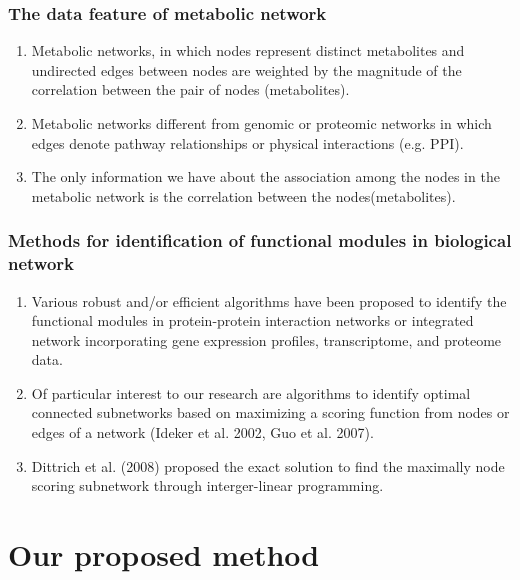 \documentclass[10pt]{beamer}
\begin{document}
\begin{frame}
  \frametitle{The data feature of metabolic network}
    \begin{enumerate}
   \item<1-> Metabolic networks, in which nodes represent distinct metabolites and undirected edges between nodes are weighted by the magnitude of the correlation between the pair of nodes (metabolites). \pause
   \\
    \vspace{1ex}
   \item<2-> Metabolic networks different from genomic or proteomic networks in which edges denote pathway relationships or physical interactions (e.g. PPI).
    \pause
    \\
   \vspace{1ex}
    \item<3-> The only information we have about the association among the nodes in the metabolic network is the correlation between the nodes(metabolites).
    
  \end{enumerate}
\end{frame}


\begin{frame}
  \frametitle{Methods for identification of functional modules in biological network}
  \begin{enumerate}
    \item<1-> Various robust and/or efficient algorithms have been proposed to identify the functional modules in protein-protein interaction networks or integrated network incorporating gene expression profiles, transcriptome, and proteome data.
    \pause
   \vspace{1ex}
    \item<2-> Of particular interest to our research are algorithms to identify optimal connected subnetworks based on maximizing a scoring function from nodes or edges of a network  (Ideker et al. 2002, Guo et al. 2007).
    \pause
    \vspace{1ex}
   
    \item<3-> Dittrich et al. (2008) proposed the exact solution to find the maximally node scoring subnetwork through interger-linear programming.

  \end{enumerate}
\end{frame}

\section{Our proposed method}
\end{document}
